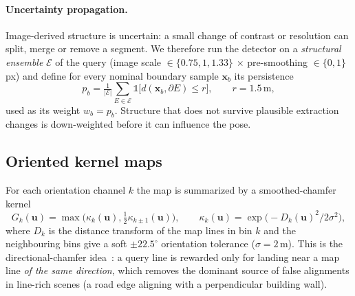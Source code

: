 \paragraph{Uncertainty propagation.} Image-derived structure is uncertain: a
small change of contrast or resolution can split, merge or remove a segment.
We therefore run the detector on a \emph{structural ensemble}
$\mathcal E$ of the query (image scale $\in\{0.75,1,1.33\}$ $\times$
pre-smoothing $\in\{0,1\}$\,px) and define for every nominal boundary sample
$\mathbf x_b$ its persistence
\begin{equation}
 p_b=\tfrac{1}{|\mathcal E|}\textstyle\sum_{E\in\mathcal E}
 \mathbb 1\bigl[d(\mathbf x_b,\partial E)\le r\bigr],\qquad r=1.5\,\mathrm m,
 \label{eq:persistence}
\end{equation}
used as its weight $w_b=p_b$. Structure that does not survive plausible
extraction changes is down-weighted before it can influence the pose.

\subsection{Oriented kernel maps}
\label{sec:refmaps}
For each orientation channel $k$ the map is summarized by a smoothed-chamfer
kernel
\begin{equation}
 G_k(\mathbf u)=\max\!\bigl(\kappa_k(\mathbf u),\tfrac12\kappa_{k\pm1}(\mathbf u)\bigr),
 \qquad \kappa_k(\mathbf u)=\exp\!\bigl(-D_k(\mathbf u)^2/2\sigma^2\bigr),
\end{equation}
where $D_k$ is the distance transform of the map lines in bin $k$ and the
neighbouring bins give a soft $\pm22.5^\circ$ orientation tolerance
($\sigma=2$\,m). This is the directional-chamfer
idea~\cite{shotton2008contour,liu2010dcm}: a query line is rewarded only for
landing near a map line \emph{of the same direction}, which removes the dominant
source of false alignments in line-rich scenes (a road edge aligning with a
perpendicular building wall).

